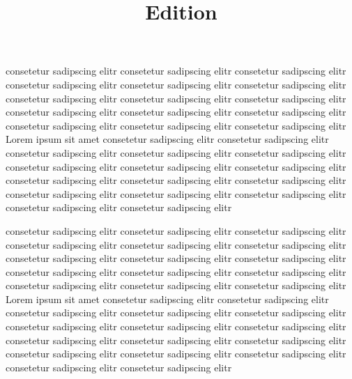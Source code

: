 \documentclass[]{book}
\begin{document}
\title{Edition}
\begin{pages}
    \begin{Leftside}
        \beginnumbering
        \pstart\startsub
         {}
       consetetur sadipscing elitr
       consetetur sadipscing elitr
       consetetur sadipscing elitr
       consetetur sadipscing elitr
       consetetur sadipscing elitr
       consetetur sadipscing elitr
       consetetur sadipscing elitr
       consetetur sadipscing elitr
       consetetur sadipscing elitr
       consetetur sadipscing elitr
       consetetur sadipscing elitr
       consetetur sadipscing elitr
       consetetur sadipscing elitr
       consetetur sadipscing elitr
       consetetur sadipscing elitr
        \endsub\pend
        \pstart
       Lorem ipsum {} sit amet
       consetetur sadipscing elitr
       consetetur sadipscing elitr
       consetetur sadipscing elitr
       consetetur sadipscing elitr
       consetetur sadipscing elitr
       consetetur sadipscing elitr
       consetetur sadipscing elitr
       consetetur sadipscing elitr
       consetetur sadipscing elitr
       consetetur sadipscing elitr
       consetetur sadipscing elitr
       consetetur sadipscing elitr
       consetetur sadipscing elitr
       consetetur sadipscing elitr
       consetetur sadipscing elitr
       consetetur sadipscing elitr
       \pend
       \endnumbering
    \end{Leftside}
    \begin{Rightside}
        \beginnumbering
        \pstart\startsub
         {}
       consetetur sadipscing elitr
       consetetur sadipscing elitr
       consetetur sadipscing elitr
       consetetur sadipscing elitr
       consetetur sadipscing elitr
       consetetur sadipscing elitr
       consetetur sadipscing elitr
       consetetur sadipscing elitr
       consetetur sadipscing elitr
       consetetur sadipscing elitr
       consetetur sadipscing elitr
       consetetur sadipscing elitr
       consetetur sadipscing elitr
       consetetur sadipscing elitr
       consetetur sadipscing elitr
        \endsub\pend
        \pstart
       Lorem ipsum  {} sit amet
       consetetur sadipscing elitr
       consetetur sadipscing elitr
       consetetur sadipscing elitr
       consetetur sadipscing elitr
       consetetur sadipscing elitr
       consetetur sadipscing elitr
       consetetur sadipscing elitr
       consetetur sadipscing elitr
       consetetur sadipscing elitr
       consetetur sadipscing elitr
       consetetur sadipscing elitr
       consetetur sadipscing elitr
       consetetur sadipscing elitr
       consetetur sadipscing elitr
       consetetur sadipscing elitr
       consetetur sadipscing elitr
       \pend
        \endnumbering
    \end{Rightside}
\end{pages}
\end{document}
